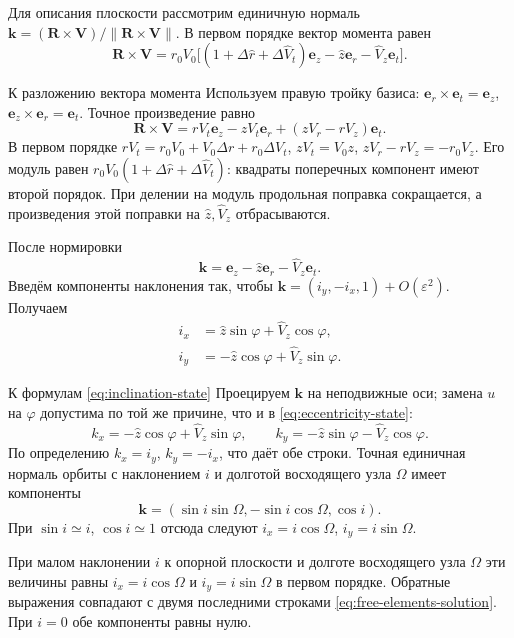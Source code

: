 \documentclass[a4paper,11pt]{article}
\numberwithin{equation}{section}
\theoremstyle{remark}
\begin{document}
Для описания плоскости рассмотрим единичную нормаль
$\boldsymbol k=(\boldsymbol R\times\boldsymbol V)/
\lVert\boldsymbol R\times\boldsymbol V\rVert$.
В первом порядке вектор момента равен
\[
 \boldsymbol R\times\boldsymbol V
 =r_0V_0\bigl[(1+\Delta\widehat r+\Delta\widehat V_t)\boldsymbol e_z
             -\widehat z\boldsymbol e_r-\widehat V_z\boldsymbol e_t\bigr].
\]
\begin{explanation}{К разложению вектора момента}
Используем правую тройку базиса:
$\boldsymbol e_r\times\boldsymbol e_t=\boldsymbol e_z$,
$\boldsymbol e_z\times\boldsymbol e_r=\boldsymbol e_t$.
Точное произведение равно
\[
\boldsymbol R\times\boldsymbol V
=rV_t\boldsymbol e_z-zV_t\boldsymbol e_r
                    +(zV_r-rV_z)\boldsymbol e_t.
\]
В первом порядке $rV_t=r_0V_0+V_0\Delta r+r_0\Delta V_t$,
$zV_t=V_0z$, $zV_r-rV_z=-r_0V_z$.
Его модуль равен
$r_0V_0(1+\Delta\widehat r+\Delta\widehat V_t)$:
квадраты поперечных компонент имеют второй порядок.
При делении на модуль продольная поправка сокращается,
а произведения этой поправки на $\widehat z,\widehat V_z$
отбрасываются.
\end{explanation}
После нормировки
\[
 \boldsymbol k=\boldsymbol e_z-\widehat z\boldsymbol e_r
                                      -\widehat V_z\boldsymbol e_t.
\]
Введём компоненты наклонения так, чтобы
$\boldsymbol k=(i_y,-i_x,1)+O(\varepsilon^2)$. Получаем
\begin {equation}
 \boxed{\begin {aligned}
  i_x&=\widehat z\sin\varphi+\widehat V_z\cos\varphi,\\
  i_y&=-\widehat z\cos\varphi+\widehat V_z\sin\varphi.
 \end {aligned}}
 \label {eq:inclination-state}
\end {equation}
\begin{explanation}{К формулам \eqref{eq:inclination-state}}
Проецируем $\boldsymbol k$ на неподвижные оси; замена $u$ на
$\varphi$ допустима по той же причине, что и в
\eqref{eq:eccentricity-state}:
\[
k_x=-\widehat z\cos\varphi+\widehat V_z\sin\varphi,\qquad
k_y=-\widehat z\sin\varphi-\widehat V_z\cos\varphi.
\]
По определению $k_x=i_y$, $k_y=-i_x$, что даёт обе строки.
Точная единичная нормаль орбиты с наклонением $i$ и долготой
восходящего узла $\Omega$ имеет компоненты
\[
\boldsymbol k=(\sin i\sin\Omega,-\sin i\cos\Omega,\cos i).
\]
При $\sin i\simeq i$, $\cos i\simeq1$ отсюда следуют
$i_x=i\cos\Omega$, $i_y=i\sin\Omega$.
\end{explanation}

При малом наклонении $i$ к опорной плоскости и долготе восходящего
узла $\Omega$ эти величины равны $i_x=i\cos\Omega$ и
$i_y=i\sin\Omega$ в первом порядке. Обратные выражения совпадают
с двумя последними строками \eqref{eq:free-elements-solution}.
При $i=0$ обе компоненты равны нулю.
\end{document}
